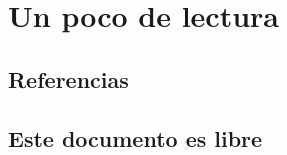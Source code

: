 

\appendix

\section{Un poco de lectura}

%
\subsection{Referencias}

  \begin{frame}{\insertsubsection}
    {}
    
  \end{frame}

%
\subsection{Este documento es libre}


